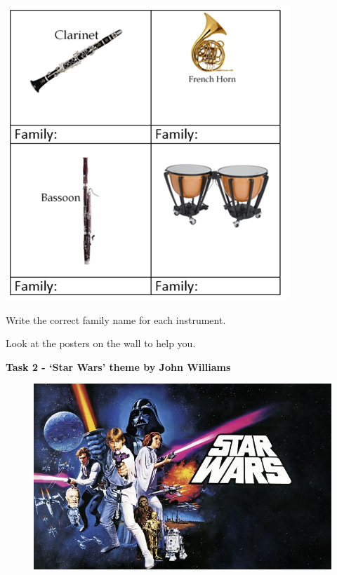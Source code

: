 \documentclass{article}
\begin{document}
\begin{minipage}[t]{0.48\textwidth}
    \includegraphics[width=\linewidth]{fam2.png}
\end{minipage}

\vspace{2em}

\noindent Write the correct family name for each instrument. 
\par \noindent Look at the posters on the wall to help you.


\newpage

\begin{center}
    \fontsize{18}{22}\selectfont
    \textbf{Task 2 - ‘Star Wars’ theme by John Williams}
\end{center}

\vspace{1em}

\setlength{\columnsep}{1.5em} %

\begin{figure} 
    \vspace{-0.8em} 
    \centering
    \includegraphics[width=\linewidth]{t2pic.jpg}
\end{figure}
\end{document}
